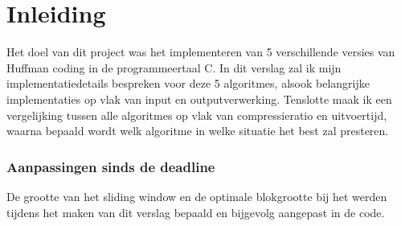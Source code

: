 \chapter*{Inleiding}

Het doel van dit project was het implementeren van 5 verschillende versies van Huffman coding in de programmeertaal C. In dit verslag zal ik mijn implementatiedetails bespreken voor deze 5 algoritmes, alsook belangrijke implementaties op vlak van input en outputverwerking. Tenslotte maak ik een vergelijking tussen alle algoritmes op vlak van compressieratio en uitvoertijd, waarna bepaald wordt welk algoritme in welke situatie het best zal presteren.

\subsection*{Aanpassingen sinds de deadline}
De grootte van het sliding window en de optimale blokgrootte bij het \huffblock werden tijdens het maken van dit verslag bepaald en bijgevolg aangepast in de code.
